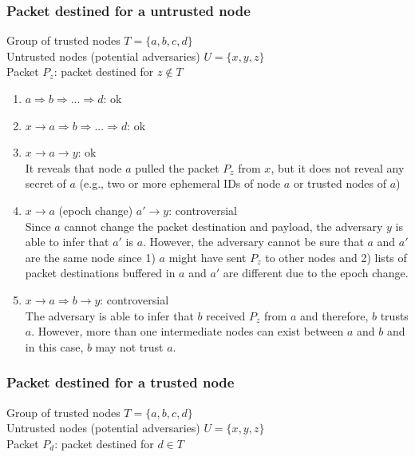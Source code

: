 \documentclass[11pt]{article}
\begin{document}
\subsubsection{Packet destined for a untrusted node}
Group of trusted nodes $T = \{a, b, c, d\}$	\\
Untrusted nodes (potential adversaries) $U = \{x, y, z\}$	\\
Packet $P_z$: packet destined for $z \notin T$	\\


\begin{enumerate}
\item $a \Rightarrow b \Rightarrow ... \Rightarrow d$: ok

\item $x \rightarrow a \Rightarrow b \Rightarrow ... \Rightarrow d$: ok

\item $x \rightarrow a	\rightarrow y$: ok	\\
It reveals that node $a$ pulled the packet $P_z$ from $x$, but it does not reveal any secret of $a$ (e.g., two or more ephemeral IDs of node $a$ or trusted nodes of $a$)


\item $x \rightarrow a$ (epoch change) $a' \rightarrow y$: controversial \\
Since $a$ cannot change the packet destination and payload, the adversary $y$ is able to infer that $a'$ is $a$. 
However, the adversary cannot be sure that $a$ and $a'$ are the same node since 1) $a$ might have sent $P_z$ to other nodes and 2) lists of packet destinations buffered in $a$ and $a'$ are different due to the epoch change. 


\item $x \rightarrow a \Rightarrow b \rightarrow y$: controversial	\\
The adversary is able to infer that $b$ received $P_z$ from $a$ and therefore, $b$ trusts $a$. 
However, more than one intermediate nodes can exist between $a$ and $b$ and in this case, $b$ may not trust $a$. 

\end{enumerate}



\subsubsection{Packet destined for a trusted node}
Group of trusted nodes $T = \{a, b, c, d\}$	\\
Untrusted nodes (potential adversaries) $U = \{x, y, z\}$	\\
Packet $P_d$: packet destined for $d \in T$	\\
\end{document}
